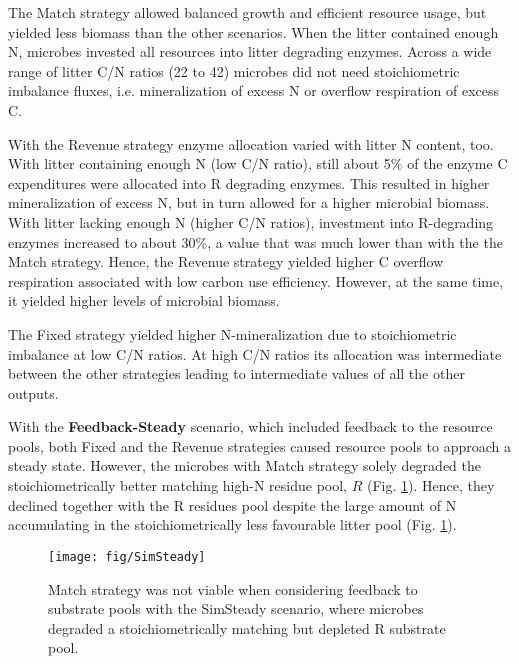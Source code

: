 The Match strategy allowed balanced growth and efficient resource usage, but
yielded less biomass than the other scenarios. When the litter contained enough
N, microbes invested all resources into litter degrading enzymes.
Across a wide range of litter C/N ratios (22 to 42) microbes did not need
stoichiometric imbalance fluxes, i.e. mineralization of excess N
or overflow respiration of excess C.  

With the Revenue strategy enzyme allocation varied with litter N content, too.
With litter containing enough N (low C/N ratio), still about 5\% of the enzyme C
expenditures were allocated into R degrading enzymes. This resulted in higher
mineralization of excess N, but in turn allowed for a higher microbial biomass.
With litter lacking enough N (higher C/N ratios), investment into R-degrading enzymes
increased to about 30\%, a value that was much lower than with the the Match
strategy. Hence, the Revenue strategy yielded higher C overflow respiration
associated with low carbon use efficiency. However, at the same time, it
yielded higher levels of microbial biomass.

The Fixed strategy yielded higher N-mineralization due to stoichiometric
imbalance at low C/N ratios.
At high C/N ratios its allocation was intermediate between the other strategies leading
to intermediate values of all the other outputs.


With the \textbf{Feedback-Steady} scenario, which included feedback to the
resource pools, both Fixed and the Revenue strategies caused
resource pools to approach a steady state.
However, the microbes with Match strategy solely degraded the
stoichiometrically better matching high-N residue pool, $R$ (Fig.
\ref{fig:SimSteady}). Hence, they declined together with the R residues
pool despite the large amount of N accumulating in the stoichiometrically less
favourable litter pool (Fig. \ref{fig:SimSteady}).

\begin{figure}[t]
\vspace*{2mm}
\begin{center} 
\texttt{[image: fig/SimSteady]} 
\end{center}
\caption{Match strategy was not viable when considering feedback to
substrate pools with the SimSteady scenario, where microbes degraded a
stoichiometrically matching but depleted R substrate pool.
\label{fig:SimSteady}} 
\end{figure}

